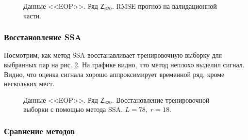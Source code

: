 \documentclass[specialist,
               substylefile = spbu.rtx,
               subf,href,colorlinks=true, 12p]{disser}
\begin{document}
\begin{figure}[H]
	\caption{Данные <<EOP>>. Ряд $\mathsf{Z}_{620}$. RMSE прогноз на валидационной части.}
	\label{eop_ssa_forecast}
\end{figure}

\subsubsection{Восстановление SSA}
Посмотрим, как метод SSA восстанавливает тренировочную выборку для выбранных пар на рис. \ref{eop_rec}. На графике видно, что метод неплохо выделил сигнал. Видно, что оценка сигнала хорошо аппроксимирует временной ряд, кроме нескольких мест.

\begin{figure}[H]
	\captionsetup{justification=centering}
	\caption{Данные <<EOP>>. Ряд $\mathsf{Z}_{620}$. Восстановление тренировочной выборки с помощью метода SSA. $L = 78, \; r = 18$.}
	\label{eop_rec}
\end{figure}

\subsubsection{Сравнение методов}
\end{document}

